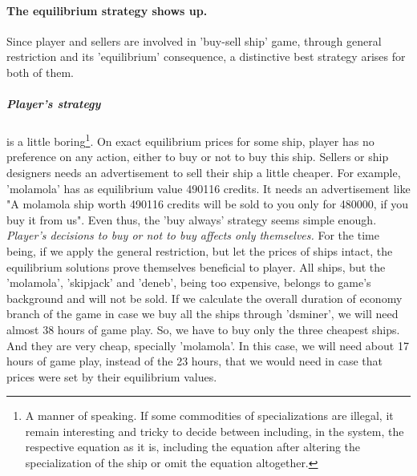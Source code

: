 \documentclass[]{article}
\begin{document}
\paragraph{The equilibrium strategy shows up.} Since player and sellers are involved in 'buy-sell ship' game, through general restriction and its 'equilibrium' consequence, a distinctive best strategy arises for both of them.
\subparagraph{Player's strategy} is a little boring\footnote{A manner of speaking. If some commodities of specializations are illegal, it remain interesting and tricky to decide between including, in the system, the respective equation as it is, including the equation after altering the specialization of the ship or omit the equation altogether.}. On exact equilibrium prices for some ship, player has no preference on any action, either to buy or not to buy this ship. Sellers or ship designers needs an advertisement to sell their ship a little cheaper. For example, 'molamola' has as equilibrium value 490116 credits. It needs an advertisement like "A molamola ship worth 490116 credits will be sold to you only for 480000, if you buy it from us". Even thus, the 'buy always' strategy seems simple enough. \emph{Player's decisions to buy or not to buy affects only themselves.} For the time being, if we apply the general restriction, but let the prices of ships intact, the equilibrium solutions prove themselves  beneficial to player. All ships, but the 'molamola', 'skipjack' and 'deneb', being too expensive, belongs to game's background and will not be sold. If we calculate the overall duration of economy branch of the game in case we buy all the ships through 'dsminer', we will need almost 38 hours of game play. So, we have to buy only the three cheapest ships. And they are very cheap, specially 'molamola'. In this case, we will need about 17 hours of game play, instead of the 23 hours, that we would need in case that prices were set by their equilibrium values. 
\end{document}
